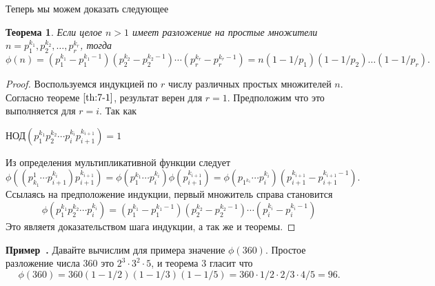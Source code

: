 \documentclass[11pt]{article}
\newtheorem{theorem}{Теорема}
\newcounter{example}[section]
\newenvironment{example}[1][]{\refstepcounter{example}\par\medskip
	\noindent \textbf{Пример~\theexample. #1} \rmfamily}{\medskip}
\begin{document}
\begin{center}
Теперь мы можем доказать следующее
\end{center}
\begin{theorem}
	Если целое $n>1$ имеет разложение на простые множители $n=p_{1}^{k_1},p_{2}^{k_2},\ldots, p_{r}^{k_r}$, тогда
	\[\phi(n) =(p_{1}^{k_1}-p_{1}^{k_{1}-1})(p_{2}^{k_{2}}-p_{2}^{k_{2}-1})\cdots (p_{r}^{k_{r}}-p_{r}^{k_{r}-1})=n(1-1/p_1)(1-1/p_2)\ldots(1-1/p_r).\]
\end{theorem}
\begin{proof}
	Воспользуемся индукцией по $r$ числу различных простых множителей $n$. Согласно теореме $\ref{th:7-1}$, результат верен для $r=1$. Предположим что это выполняется для $r=i$. Так как
\begin{center}
	НОД$(p^{k_1}_{1}p^{k_2}_{2}\cdots p^{k_i}_{i}p^{k_{i+1}}_{i+1})=1$
\end{center}
Из определения мультипликативной функции следует
\[\phi((p_{k_1}^{1}\cdots p^{k_i}_{i+1})p_{i+1}^{k_{i+1}})=\phi(p^{k_1}_{1}\cdots p_{i}^{k_i}) \phi(p_{i+1}^{k_{i+1}})=\phi(p_{1^{k_1}}\cdots p_{i}^{k_{i}})(p_{i+1}^{k_{i+1}}-p_{i+1}^{k_{i+1}-1}).\]
Ссылаясь на предположение индукции, первый множитель справа становится
\[\phi(p_{1}^{k_1}p_{2}^{k_2}\cdots p_{i}^{k_i})=(p_{1}^{k_1}-p_{1}^{k_1-1})(p_{2}^{k_2}-p_{2}^{k_2-1})\cdots
(p_{i}^{k_i}-p_{i}^{k_i-1})\]
Это являетя доказательством шага индукции, а так же и теоремы.
\end{proof}
\begin{example}
	Давайте вычислим для примера значение $\phi(360)$. Простое разложение числа $360$ это $2^3\cdot3^2\cdot5$, и теорема $3$ гласит что 
	\[\phi(360)=360(1-1/2)(1-1/3)(1-1/5)=360\cdot1/2\cdot2/3\cdot4/5=96.
	\]
\end{example}																					
\end{document}

